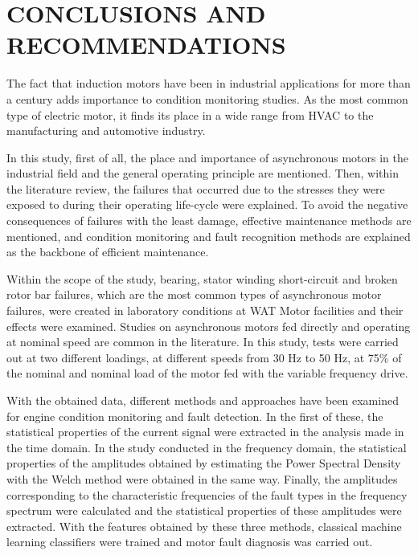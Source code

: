 \chapter{CONCLUSIONS AND RECOMMENDATIONS}\label{Ch5}

The fact that induction motors have been in industrial applications for more than a century adds importance to condition monitoring studies. As the most common type of electric motor, it finds its place in a wide range from HVAC to the manufacturing and automotive industry.

In this study, first of all, the place and importance of asynchronous motors in the industrial field and the general operating principle are mentioned. Then, within the literature review, the failures that occurred due to the stresses they were exposed to during their operating life-cycle were explained. To avoid the negative consequences of failures with the least damage, effective maintenance methods are mentioned, and condition monitoring and fault recognition methods are explained as the backbone of efficient maintenance.

Within the scope of the study, bearing, stator winding short-circuit and broken rotor bar failures, which are the most common types of asynchronous motor failures, were created in laboratory conditions at WAT Motor facilities and their effects were examined. Studies on asynchronous motors fed directly and operating at nominal speed are common in the literature. In this study, tests were carried out at two different loadings, at different speeds from 30 Hz to 50 Hz, at 75\% of the nominal and nominal load of the motor fed with the variable frequency drive.

With the obtained data, different methods and approaches have been examined for engine condition monitoring and fault detection. In the first of these, the statistical properties of the current signal were extracted in the analysis made in the time domain. In the study conducted in the frequency domain, the statistical properties of the amplitudes obtained by estimating the Power Spectral Density with the Welch method were obtained in the same way. Finally, the amplitudes corresponding to the characteristic frequencies of the fault types in the frequency spectrum were calculated and the statistical properties of these amplitudes were extracted. With the features obtained by these three methods, classical machine learning classifiers were trained and motor fault diagnosis was carried out.

